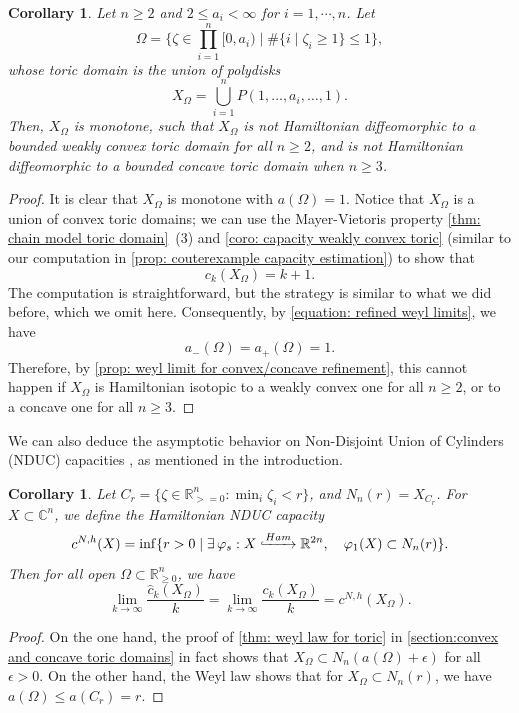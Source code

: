 \documentclass[11pt]{amsart}
\numberwithin{equation}{section}
\theoremstyle{plain}
\newtheorem{Coro}[coro]{Corollary}
\theoremstyle{definition}
\theoremstyle{remark}
\newcommand{\bC} { {\mathbb{C}}}
\newcommand{\bR} { {\mathbb{R}}}
\begin{document}
\begin{Coro}\label{coro: neither convex nor concave}Let $n\geq 2$ and $2\leq a_i<\infty$ for $i=1,\cdots,n$. Let
\[\Omega=\Big\{\zeta\in \prod_{i=1}^n[0,a_i)\mid \#\{i\mid \zeta_i\geq 1\}\leq 1\Big\},\]
whose toric domain is the union of polydisks
\[X_\Omega=\bigcup_{i=1}^n P(1,\dots,a_i,\dots,1).\]
Then, $X_\Omega$ is monotone, such that $X_\Omega$ is not Hamiltonian diffeomorphic to a bounded weakly convex toric domain for all $n\geq 2$, and is not Hamiltonian diffeomorphic to a bounded concave toric domain  when $n\geq 3$.\end{Coro}
\begin{proof}It is clear that $X_\Omega$ is monotone with $a(\Omega)=1$. Notice that $X_\Omega$ is a union of convex toric domains; we can use the Mayer-Vietoris property \autoref{thm: chain model toric domain}~(3) and \autoref{coro: capacity weakly convex toric} (similar to our computation in \autoref{prop: couterexample capacity estimation}) to show that
\[c_k(X_\Omega)=k+1.\]
The computation is straightforward, but the strategy is similar to what we did before, which we omit here. Consequently, by \autoref{equation: refined weyl limits}, we have 
\[a_-(\Omega) = a_+(\Omega)=1.\]
Therefore, by \autoref{prop: weyl limit for convex/concave refinement}, this cannot happen if $X_\Omega$ is Hamiltonian isotopic to a weakly convex one for all $n\geq 2$, or to a concave one for all $n\geq 3$.    
\end{proof}





We can also deduce the asymptotic behavior on Non-Disjoint Union of Cylinders (NDUC) capacities \cite[Definition 4]{GPR22}, as mentioned in the introduction.

\begin{Coro}\label{coro: NDUC}Let $C_r=\{\zeta \in \bR^n_{>=0} : \min_i \zeta_i < r\}$, and $N_n(r)=X_{C_r}$. For $X\subset \bC^{n}$, we define the \textit{Hamiltonian NDUC capacity}
\[c^{N,h}(X)=\inf\{r>0\mid \exists\,\varphi_s:X \lhook\joinrel\xrightarrow{Ham} \bR^{2n}, \quad \varphi_1(X)\subset N_n(r)\}.\]
Then for all open $\Omega\subset \bR^n_{\geq 0}$, we have
\[\lim_{k\to \infty}\frac{\widehat{c}_k(X_\Omega)}{k}=\lim_{k\to \infty}\frac{{c}_k(X_\Omega)}{k}=c^{N,h}(X_\Omega).\]    
\end{Coro}
\begin{proof}On the one hand, the proof of \autoref{thm: weyl law for toric} in \autoref{section:convex and concave toric domains} in fact shows that $X_\Omega\subset N_n(a(\Omega)+\epsilon)$ for all $\epsilon>0$. On the other hand, the Weyl law shows that for $X_\Omega\subset N_n(r)$, we have $a(\Omega)\leq a(C_r) = r$.   
\end{proof}
\end{document}
